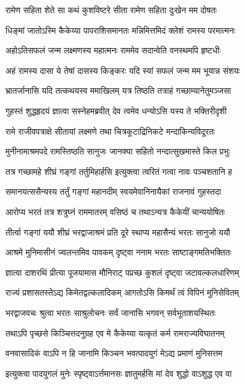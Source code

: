 \twolineshloka
{रामेण सहिता शेते सा कथं कुशविष्टरे}
{सीता रामेण सहिता दुःखेन मम दोषतः} %

\twolineshloka
{धिङ्मां जातोऽस्मि कैकेय्या पापराशिसमानतः}
{मन्निमित्तमिदं क्लेशं रामस्य परमात्मनः} %

\twolineshloka
{अहोऽतिसफलं जन्म लक्ष्मणस्य महात्मनः}
{राममेव सदान्वेति वनस्थमपि हृष्टधीः} %

\twolineshloka
{अहं रामस्य दासा ये तेषां दासस्य किङ्करः}
{यदि स्यां सफलं जन्म मम भूयान्न संशयः} %

\twolineshloka
{भ्रातर्जानासि यदि तत्कथयस्व ममाखिलम्}
{यत्र तिष्ठति तत्राहं गच्छाम्यानेतुमञ्जसा} %

\twolineshloka
{गुहस्तं शुद्धहृदयं ज्ञात्वा सस्नेहमब्रवीत्}
{देव त्वमेव धन्योऽसि यस्य ते भक्तिरीदृशी} %

\twolineshloka
{रामे राजीवपत्राक्षे सीतायां लक्ष्मणे तथा}
{चित्रकूटाद्रिनिकटे मन्दाकिन्यविदूरतः} %

\twolineshloka
{मुनीनामाश्रमपदे रामस्तिष्ठति सानुजः}
{जानक्या सहितो नन्दात्सुखमास्ते किल प्रभुः} %

\twolineshloka
{तत्र गच्छामहे शीघ्रं गङ्गां तर्तुमिहार्हसि}
{इत्युक्त्वा त्वरितं गत्वा नावः पञ्चशतानि ह} %

\twolineshloka
{समानयत्ससैन्यस्य तर्तुं गङ्गां महानदीम्}
{स्वयमेवानिनायैकां राजनावं गुहस्तदा} %

\twolineshloka
{आरोप्य भरतं तत्र शत्रुघ्नं राममातरम्}
{वसिष्ठं च तथाऽन्यत्र कैकेयीं चान्ययोषितः} %

\twolineshloka
{तीर्त्वा गङ्गां ययौ शीघ्रं भरद्वाजाश्रमं प्रति}
{दूरे स्थाप्य महासैन्यं भरतः सानुजो ययौ} %

\twolineshloka
{आश्रमे मुनिमासीनं ज्वलन्तमिव पावकम्}
{दृष्ट्वा ननाम भरतः साष्टाङ्गमतिभक्तितः} %

\twolineshloka
{ज्ञात्वा दाशरथिं प्रीत्या पूजयामास मौनिराट्}
{पप्रच्छ कुशलं दृष्ट्वा जटावल्कलधारिणम्} %

\twolineshloka
{राज्यं प्रशासतस्तेऽद्य किमेतद्वल्कलादिकम्}
{आगतोऽसि किमर्थं त्वं विपिनं मुनिसेवितम्} %

\twolineshloka
{भरद्वाजवचः श्रुत्वा भरतः साश्रुलोचनः}
{सर्वं जानासि भगवन् सर्वभूताशयस्थितः} %

\twolineshloka
{तथाऽपि पृच्छसे किञ्चित्तदनुग्रह एव मे}
{कैकेय्या यत्कृतं कर्म रामराज्यविघातनम्} %

\twolineshloka
{वनवासादिकं वाऽपि न हि जानामि किञ्चन}
{भवत्पादयुगं मेऽद्य प्रमाणं मुनिसत्तम} %

\twolineshloka
{इत्युक्त्वा पादयुगलं मुनेः स्पृष्ट्वाऽर्त्तमानसः}
{ज्ञातुमर्हसि मां देव शुद्धो वाऽशुद्ध एव वा} %

